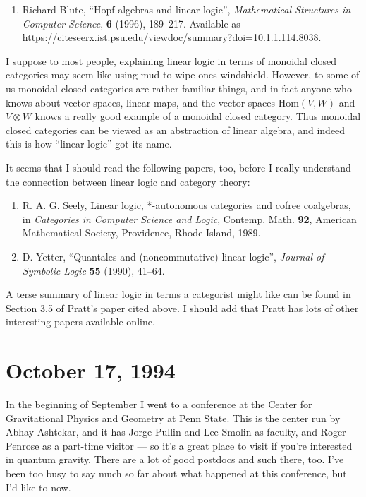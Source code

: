 \documentclass[12pt]{article}
\def\tightlist{}
\begin{document}
\begin{enumerate}
\def\labelenumi{\arabic{enumi})}
\setcounter{enumi}{2}
\tightlist
\item
  Richard Blute, ``Hopf algebras and linear logic'', 
  \emph{Mathematical Structures in Computer Science}, \textbf{6} (1996), 189--217.
  Available as \href{https://citeseerx.ist.psu.edu/viewdoc/summary?doi=10.1.1.114.8038}{https://citeseerx.ist.psu.edu/viewdoc/summary?doi=10.1.1.114.8038}.
\end{enumerate}
\noindent
I suppose to most people, explaining linear logic in terms of monoidal
closed categories may seem like using mud to wipe ones windshield.
However, to some of us monoidal closed categories are rather familiar
things, and in fact anyone who knows about vector spaces, linear maps,
and the vector spaces \(\mathrm{Hom}(V,W)\) and \(V\otimes W\) knows a
really good example of a monoidal closed category. Thus monoidal closed
categories can be viewed as an abstraction of linear algebra, and indeed
this is how ``linear logic'' got its name.

It seems that I should read the following papers, too, before I really
understand the connection between linear logic and category theory:

\begin{enumerate}
\def\labelenumi{\arabic{enumi})}
\setcounter{enumi}{3}
\item
  R. A. G. Seely, Linear logic, *-autonomous categories and cofree coalgebras, in \emph{Categories in Computer Science and Logic}, Contemp.
  Math. \textbf{92}, American Mathematical Society, Providence, Rhode Island, 1989.
\item
  D. Yetter, ``Quantales and (noncommutative) linear logic'',
  \emph{Journal of Symbolic Logic} \textbf{55} (1990), 41--64.
\end{enumerate}
\noindent
A terse summary of linear logic in terms a categorist might like can be
found in Section 3.5 of Pratt's paper cited above. I should add that
Pratt has lots of other interesting papers available online.



\hypertarget{week41}{%
\section{October 17, 1994}\label{week41}}

In the beginning of September I went to a conference at the Center for
Gravitational Physics and Geometry at Penn State. This is the center run
by Abhay Ashtekar, and it has Jorge Pullin and Lee Smolin as faculty,
and Roger Penrose as a part-time visitor --- so it's a great place to
visit if you're interested in quantum gravity. There are a lot of good
postdocs and such there, too. I've been too busy to say much so far
about what happened at this conference, but I'd like to now.
\end{document}
